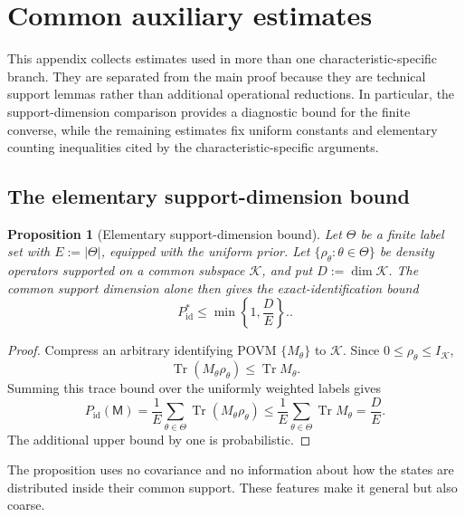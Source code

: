 \documentclass[11pt]{article}
\newcommand{\Tr}{\operatorname{Tr}}
\newcommand{\1}{\mathbf 1}
\theoremstyle{plain}
\newtheorem{proposition}[theorem]{Proposition}
\theoremstyle{definition}
\theoremstyle{remark}
\begin{document}
\section{Common auxiliary estimates}
\label{app:common-auxiliary-estimates}
\label{app:dimension-bound-insufficient}
This appendix collects estimates used in more than one characteristic-specific branch.  They are separated from the main proof because they are technical support lemmas rather than additional operational reductions.  In particular, the support-dimension comparison provides a diagnostic bound for the finite converse, while the remaining estimates fix uniform constants and elementary counting inequalities cited by the characteristic-specific arguments.

\subsection{The elementary support-dimension bound}
\begin{proposition}[Elementary support-dimension bound]
\label{prop:elementary-support-dimension}
Let $\Theta$ be a finite label set with $E:=\lvert \Theta\rvert$, equipped with the
uniform prior.  Let $\{\rho_\theta:\theta\in\Theta\}$ be density operators
supported on a common subspace $\mathcal K$, and put $D:=\dim\mathcal K$.
The common support dimension alone then gives the exact-identification bound
\begin{equation}
 P_{\mathrm{id}}^*\le \min\left\{1,\frac{D}{E}\right\}.       \label{eq:elementary-support-dimension}.
\end{equation}
\end{proposition}
\begin{proof}
Compress an arbitrary identifying POVM $\{M_\theta\}$ to $\mathcal K$.  Since
$0\le\rho_\theta\le I_{\mathcal K}$,
\[
 \Tr(M_\theta\rho_\theta)\le\Tr M_\theta.
\]
Summing this trace bound over the uniformly weighted labels gives
\[
 P_{\mathrm{id}}(\mathsf M)
 =\frac1E\sum_{\theta\in\Theta}\Tr(M_\theta\rho_\theta)
 \le\frac1E\sum_{\theta\in\Theta}\Tr M_\theta
 =\frac{D}{E}.
\]
The additional upper bound by one is probabilistic.
\end{proof}
The proposition uses no covariance and no information about how the states are
distributed inside their common support.  These features make it general but
also coarse.
\end{document}
